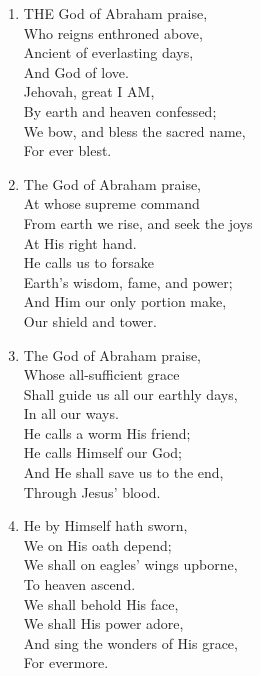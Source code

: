\documentclass[11pt,a4paper]{article}
\begin{document}
\begin{enumerate}
    \item THE God of Abraham praise, \\
        Who reigns enthroned above, \\
        Ancient of everlasting days, \\
        And God of love. \\
        Jehovah, great I AM, \\
        By earth and heaven confessed; \\
        We bow, and bless the sacred name, \\
        For ever blest.

    \item The God of Abraham praise, \\
        At whose supreme command \\
        From earth we rise, and seek the joys \\
        At His right hand. \\
        He calls us to forsake \\
        Earth's wisdom, fame, and power; \\
        And Him our only portion make, \\
        Our shield and tower.

    \item The God of Abraham praise, \\
        Whose all-sufficient grace \\
        Shall guide us all our earthly days, \\
        In all our ways. \\
        He calls a worm His friend; \\
        He calls Himself our God; \\
        And He shall save us to the end, \\
        Through Jesus' blood.

    \item He by Himself hath sworn, \\
        We on His oath depend; \\
        We shall on eagles' wings upborne, \\
        To heaven ascend. \\
        We shall behold His face, \\
        We shall His power adore, \\
        And sing the wonders of His grace, \\
        For evermore.


\end{enumerate}
\end{document}
